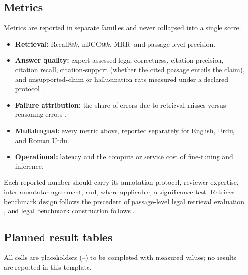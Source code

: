 \documentclass[10pt,twocolumn]{article}
\newcommand{\tbd}{\textcolor{black!45}{--}}
\begin{document}
\subsection{Metrics}
\label{sec:rd-metrics}

Metrics are reported in separate families and never collapsed into a single score.
\begin{itemize}[leftmargin=1.4em, itemsep=2pt, topsep=2pt]
\item \textbf{Retrieval:} Recall@$k$, nDCG@$k$, MRR, and passage-level precision.
\item \textbf{Answer quality:} expert-assessed legal correctness, citation precision, citation recall,
citation-support (whether the cited passage entails the claim), and unsupported-claim or hallucination
rate measured under a declared protocol \citep{dahl2024, magesh2025}.
\item \textbf{Failure attribution:} the share of errors due to retrieval misses versus reasoning errors
\citep{afane2026}.
\item \textbf{Multilingual:} every metric above, reported separately for English, Urdu, and Roman Urdu.
\item \textbf{Operational:} latency and the compute or service cost of fine-tuning and inference.
\end{itemize}
Each reported number should carry its annotation protocol, reviewer expertise, inter-annotator
agreement, and, where applicable, a significance test. Retrieval-benchmark design follows the precedent
of passage-level legal retrieval evaluation \citep{pipitone2024, butler2026}, and legal benchmark
construction follows \citep{chalkidis2022, guha2023}.

\subsection{Planned result tables}
\label{sec:rd-tables}

All cells are placeholders (\tbd) to be completed with measured values; no results are reported in this
template.
\end{document}
